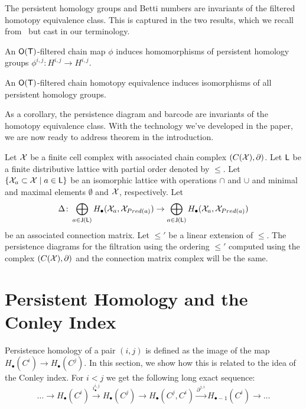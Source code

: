 The persistent homology groups and Betti numbers are invariants of the filtered homotopy equivalence class.   This is captured in the two results, which we recall from~\cite{mn} but cast in our terminology.

\begin{prop}
An ${\mathsf O}({\mathsf T})$-filtered chain map $\phi$ induces homomorphisms of persistent homology groups $\phi^{i,j}:H^{i,j}\to H^{i,j}$.
\end{prop}

\begin{prop}
An ${\mathsf O}({\mathsf T})$-filtered chain homotopy equivalence induces isomorphisms of all persistent homology groups.
\end{prop}

As a corollary, the persistence diagram and barcode are invariants of the homotopy equivalence class.   With the technology we've developed in the paper, we are now ready to address theorem in the introduction.

\begin{thm}
\label{thm:PH}
Let ${\mathcal X}$ be a finite cell complex with associated chain complex $(C({\mathcal X}),\partial)$.
Let ${\mathsf L}$ be a finite distributive lattice with  partial order denoted by $\leq$.
Let $\left\{{{\mathcal X}_a \subset {\mathcal X} \mid a\in {\mathsf L}}\right\}$ be an isomorphic lattice with operations $\cap$ and $\cup$ and minimal and maximal elements $\emptyset$ and ${\mathcal X}$, respectively.
Let 
\[
\Delta \colon \bigoplus_{a\in {\mathsf J}({\mathsf L})} H_\bullet({\mathcal X}_a,{\mathcal X}_{Pred(a)}) \to \bigoplus_{a\in {\mathsf J}({\mathsf L})} H_\bullet({\mathcal X}_a,{\mathcal X}_{Pred(a)})
\]
be an associated connection matrix.
Let $\leq'$ be a linear extension of $\leq$.
The persistence diagrams for the filtration using the ordering $\leq'$ computed using the complex $(C({\mathcal X}),\partial)$ and the connection matrix complex will be the same.  
\end{thm}

\section{Persistent Homology and the Conley Index}


Persistence homology of a pair $(i,j)$ is defined as the image of the map $H_\bullet(C^i)\to H_\bullet(C^j)$.  In this section, we show how this is related to the idea of the Conley index.   For $i<j$ we get the following long exact sequence:
\[
\ldots \to H_\bullet(C^i)\xrightarrow{i_\bullet^{i,j}} H_\bullet(C^j)\to H_\bullet(C^j,C^i)\xrightarrow{\partial^{j,i}} H_{\bullet-1}(C^i)\to\ldots
\]

